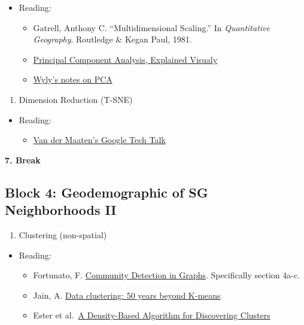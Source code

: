 \documentclass[]{book}
\providecommand{\tightlist}{%
  \setlength{\itemsep}{0pt}\setlength{\parskip}{0pt}}
\begin{document}
\begin{itemize}
\tightlist
\item
  Reading:

  \begin{itemize}
  \tightlist
  \item
    Gatrell, Anthony C. ``Multidimensional Scaling.'' In \emph{Quantitative Geography}. Routledge \& Kegan Paul, 1981.
  \item
    \href{http://setosa.io/ev/principal-component-analysis/}{Principal Component Analysis, Explained Visualy}
  \item
    \href{http://ibis.geog.ubc.ca/~ewyly/teaching/606_pca.pdf}{Wyly's notes on PCA}
  \end{itemize}
\end{itemize}

\begin{enumerate}
\def\labelenumi{\arabic{enumi}.}
\setcounter{enumi}{5}
\tightlist
\item
  Dimension Reduction (T-SNE)
\end{enumerate}

\begin{itemize}
\tightlist
\item
  Reading:

  \begin{itemize}
  \tightlist
  \item
    \href{https://www.youtube.com/watch?v=RJVL80Gg3lA\&list=UUtXKDgv1AVoG88PLl8nGXmw}{Van der Maaten's Google Tech Talk}
  \end{itemize}
\end{itemize}

\textbf{7. Break}

\hypertarget{block-4-geodemographic-of-sg-neighborhoods-ii}{%
\subsection{Block 4: Geodemographic of SG Neighborhoods II}\label{block-4-geodemographic-of-sg-neighborhoods-ii}}

\begin{enumerate}
\def\labelenumi{\arabic{enumi}.}
\setcounter{enumi}{7}
\tightlist
\item
  Clustering (non-spatial)
\end{enumerate}

\begin{itemize}
\tightlist
\item
  Reading:

  \begin{itemize}
  \tightlist
  \item
    Fortunato, F. \href{https://arxiv.org/abs/0906.0612}{Community Detection in Graphs}. Specifically section 4a-c.
  \item
    Jain, A. \href{https://doi.org/10.1016/j.patrec.2009.09.011}{Data clustering: 50 years beyond K-means}
  \item
    Ester et al.~\href{https://www.aaai.org/Papers/KDD/1996/KDD96-037.pdf}{A Density-Based Algorithm for Discovering Clusters}
  \end{itemize}
\end{itemize}
\end{document}

